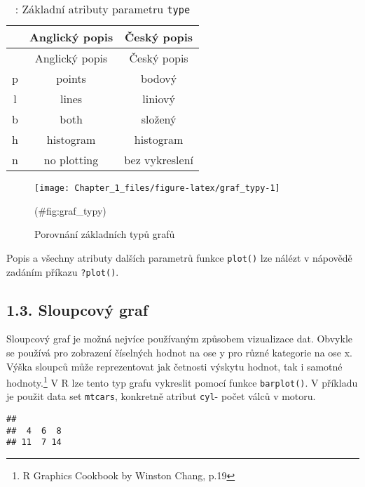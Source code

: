 \documentclass[]{article}
\newenvironment{Shaded}{\begin{snugshade}}{\end{snugshade}}
\newcommand{\KeywordTok}[1]{\textcolor[rgb]{0.13,0.29,0.53}{\textbf{#1}}}
\newcommand{\OperatorTok}[1]{\textcolor[rgb]{0.81,0.36,0.00}{\textbf{#1}}}
\newcommand{\NormalTok}[1]{#1}
\let\rmarkdownfootnote\footnote%
\def\footnote{\protect\rmarkdownfootnote}
\theoremstyle{definition}
\theoremstyle{definition}
\theoremstyle{remark}
\begin{document}
\begin{longtable}[]{@{}ccc@{}}
\caption{\label{tab:1}: Základní atributy parametru
\texttt{type}}\tabularnewline
\toprule
& Anglický popis & Český popis\tabularnewline
\midrule
\endfirsthead
\toprule
& Anglický popis & Český popis\tabularnewline
\midrule
\endhead
p & points & bodový\tabularnewline
l & lines & liniový\tabularnewline
b & both & složený\tabularnewline
h & histogram & histogram\tabularnewline
n & no plotting & bez vykreslení\tabularnewline
\bottomrule
\end{longtable}

\begin{figure}

{\centering \texttt{[image: Chapter\_1\_files/figure-latex/graf\_typy-1]} 

}

\caption{\label{fig1}Porovnání základních typů grafů}(\#fig:graf_typy)
\end{figure}

Popis a všechny atributy dalších parametrů funkce \texttt{plot()} lze
nálézt v nápovědě zadáním příkazu \texttt{?plot()}.

\newpage

\subsection{1.3. Sloupcový graf}\label{sloupcovy-graf}

Sloupcový graf je možná nejvíce používaným způsobem vizualizace dat.
Obvykle se používá pro zobrazení číselných hodnot na ose y pro různé
kategorie na ose x. Výška sloupců může reprezentovat jak četnosti
výskytu hodnot, tak i samotné hodnoty.\footnote{R Graphics Cookbook by
  Winston Chang, p.19} V R lze tento typ grafu vykreslit pomocí funkce
\texttt{barplot()}. V příkladu je použit data set \texttt{mtcars},
konkretně atribut \texttt{cyl}- počet válců v motoru.

\begin{Shaded}
\end{Shaded}

\begin{verbatim}
## 
##  4  6  8 
## 11  7 14
\end{verbatim}

\begin{Shaded}
\end{Shaded}
\end{document}
